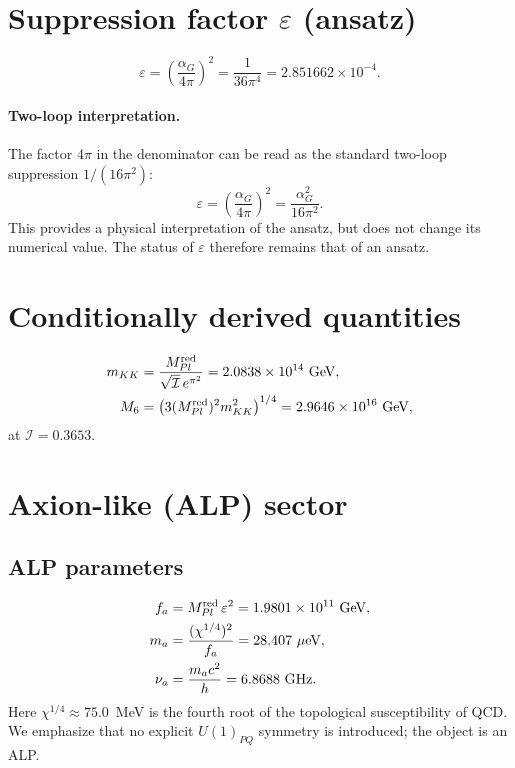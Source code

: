 \documentclass[12pt,a4paper]{article}
\numberwithin{equation}{section}
\begin{document}
\section{Suppression factor \(\varepsilon\) (ansatz)}
\begin{equation}
\varepsilon = \left(\frac{\alpha_G}{4\pi}\right)^2 = \frac{1}{36\pi^4} = 2.851662\times10^{-4}.
\end{equation}

\paragraph{Two-loop interpretation.}
The factor \(4\pi\) in the denominator can be read as the standard two-loop
suppression \(1/(16\pi^2)\):
\begin{equation}
\varepsilon = \left(\frac{\alpha_G}{4\pi}\right)^2
= \frac{\alpha_G^2}{16\pi^2}.
\end{equation}
This provides a physical interpretation of the ansatz, but does not change its numerical value.
The status of \(\varepsilon\) therefore remains that of an ansatz.

\section{Conditionally derived quantities}
\begin{align}
m_{KK} &= \frac{M_{Pl}^{\rm red}}{\sqrt{\mathcal{I}}\,e^{\pi^2}}
= 2.0838\times10^{14}~\text{GeV}, \\
M_6 &= \left(3 (M_{Pl}^{\rm red})^2 m_{KK}^2\right)^{1/4}
= 2.9646\times10^{16}~\text{GeV},
\end{align}
at \(\mathcal{I} = 0.3653\).

\section{Axion-like (ALP) sector}
\subsection{ALP parameters}
\begin{align}
f_a &= M_{Pl}^{\rm red}\,\varepsilon^2 = 1.9801\times10^{11}~\text{GeV}, \\
m_a &= \frac{(\chi^{1/4})^2}{f_a} = 28.407~\mu\text{eV}, \\
\nu_a &= \frac{m_a c^2}{h} = 6.8688~\text{GHz}.
\end{align}
Here \(\chi^{1/4} \approx 75.0\)~MeV is the fourth root of the topological susceptibility of QCD. We emphasize that no explicit \(U(1)_{PQ}\) symmetry is introduced; the object is an ALP.
\end{document}
